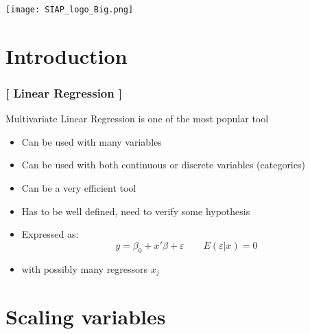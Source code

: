 \documentclass[xcolor=x11names,compress, handhouts]{beamer}
\renewcommand{\(}{\begin{columns}}
\renewcommand{\)}{\end{columns}}
\newcommand{\<}[1]{\begin{column}{#1}}
\renewcommand{\>}{\end{column}}
\begin{document}
\begin{frame}
\Large{ \color{siap}{Machine Learning for Official Statistics and SDGs}}

\hspace{1cm}


\hspace{2cm}
\begin{center}

\texttt{[image: SIAP\_logo\_Big.png]}

\end{center}
\end{frame}



\section{Introduction}

\begin{frame} %

\frametitle{\textcolor{brique}{[ Linear Regression ]}}
Multivariate Linear Regression is one of the most popular tool
\pause
\begin{itemize}[<+->]
  \item Can be used with many variables
  \item Can be used with both continuous or discrete variables (categories)
  \item Can be a very efficient tool
  \item Has to be well defined, need to verify some hypothesis
  \item[] Expressed as: $$
  y  = \beta_0 + x'\beta + \varepsilon \qquad  E (\varepsilon|x)  = 0
  $$
  \item[] with possibly many regressors $x_j$
\end{itemize}
\end{frame}

\section{Scaling variables}
\end{document}

